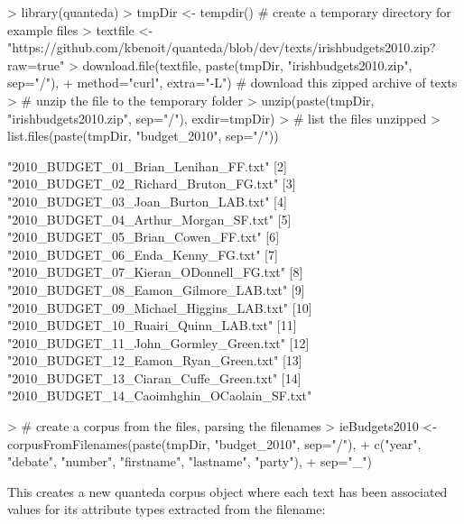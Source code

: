 \documentclass[11pt]{article}
\begin{document}
\begin{Schunk}
\begin{Sinput}
> library(quanteda)
> tmpDir <- tempdir()  # create a temporary directory for example files
> textfile <- "https://github.com/kbenoit/quanteda/blob/dev/texts/irishbudgets2010.zip?raw=true"
> download.file(textfile, paste(tmpDir, "irishbudgets2010.zip", sep="/"), 
+               method="curl", extra="-L") # download this zipped archive of texts
> # unzip the file to the temporary folder
> unzip(paste(tmpDir, "irishbudgets2010.zip", sep="/"), exdir=tmpDir) 
> # list the files unzipped
> list.files(paste(tmpDir, "budget_2010", sep="/"))
\end{Sinput}
\begin{Soutput}
 [1] "2010_BUDGET_01_Brian_Lenihan_FF.txt"      
 [2] "2010_BUDGET_02_Richard_Bruton_FG.txt"     
 [3] "2010_BUDGET_03_Joan_Burton_LAB.txt"       
 [4] "2010_BUDGET_04_Arthur_Morgan_SF.txt"      
 [5] "2010_BUDGET_05_Brian_Cowen_FF.txt"        
 [6] "2010_BUDGET_06_Enda_Kenny_FG.txt"         
 [7] "2010_BUDGET_07_Kieran_ODonnell_FG.txt"    
 [8] "2010_BUDGET_08_Eamon_Gilmore_LAB.txt"     
 [9] "2010_BUDGET_09_Michael_Higgins_LAB.txt"   
[10] "2010_BUDGET_10_Ruairi_Quinn_LAB.txt"      
[11] "2010_BUDGET_11_John_Gormley_Green.txt"    
[12] "2010_BUDGET_12_Eamon_Ryan_Green.txt"      
[13] "2010_BUDGET_13_Ciaran_Cuffe_Green.txt"    
[14] "2010_BUDGET_14_Caoimhghin_OCaolain_SF.txt"
\end{Soutput}
\begin{Sinput}
> # create a corpus from the files, parsing the filenames
> ieBudgets2010 <- corpusFromFilenames(paste(tmpDir, "budget_2010", sep="/"),
+                                      c("year", "debate", "number", "firstname", "lastname", "party"), 
+                                      sep="_")
\end{Sinput}
\end{Schunk}

This creates a new quanteda corpus object where each text has been associated values for its attribute types extracted from the filename:
\end{document}

